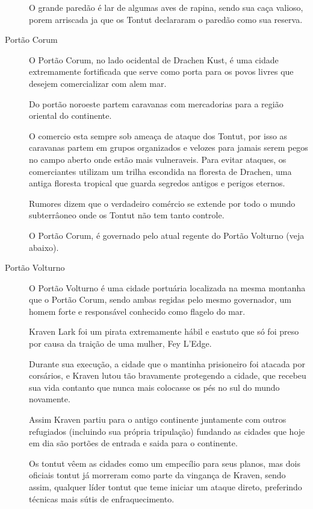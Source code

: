 \begin{description}
O grande pared\~ao \'e lar de algumas aves de rapina, sendo sua ca\c{c}a
valioso, porem arriscada ja que os Tontut declararam  o pared\~ao
como sua reserva.

\item[Port\~ao Corum]
O Port\~ao Corum, 
  no lado ocidental de Drachen Kust, \'e uma cidade extremamente
fortificada que serve como porta para os povos livres que desejem comercializar
com alem mar.

Do port\~ao noroeste partem caravanas com mercadorias para a regi\~ao oriental do
continente.

O comercio esta sempre sob amea\c{c}a de ataque dos Tontut, por isso as caravanas partem
em grupos organizados e velozes para jamais serem pegos no campo aberto onde est\~ao mais
vulneraveis. Para evitar ataques, os comerciantes utilizam um trilha escondida na floresta
de Drachen, uma antiga floresta tropical que guarda segredos antigos e perigos eternos.

Rumores dizem que o verdadeiro com\'ercio se extende por todo o mundo subterr\^aoneo onde
os Tontut n\~ao tem tanto controle.

O Port\~ao Corum, \'e governado pelo atual regente do
Port\~ao Volturno (veja abaixo). 
\item[Port\~ao Volturno]
O Port\~ao Volturno 
\'e uma cidade portu\'aria localizada na mesma montanha que o
Port\~ao Corum, sendo ambas regidas pelo mesmo
governador, um homem forte e respons\'avel conhecido como flagelo do mar.

Kraven Lark foi um pirata extremamente h\'abil e eastuto que s\'o foi
preso por causa da trai\c{c}\~ao de uma mulher, Fey L'Edge.

Durante sua execu\c{c}\~ao, a cidade que o mantinha prisioneiro
foi atacada por cors\'arios, e Kraven lutou t\~ao bravamente protegendo
a cidade, que recebeu sua vida contanto que nunca mais colocasse os p\'es
no sul do mundo novamente.

Assim Kraven partiu para o antigo continente juntamente com outros refugiados
(incluindo sua pr\'opria tripula\c{c}\~ao) fundando as cidades
que hoje em dia s\~ao port\~oes de entrada e saida para o continente.

Os tontut v\^eem as cidades como um empec\'ilio para seus planos, mas dois
oficiais tontut j\'a morreram como parte da vingan\c{c}a de Kraven, sendo
assim, qualquer l\'ider tontut que teme iniciar um ataque direto, preferindo
t\'ecnicas mais s\'utis de enfraquecimento.


\end{description}
